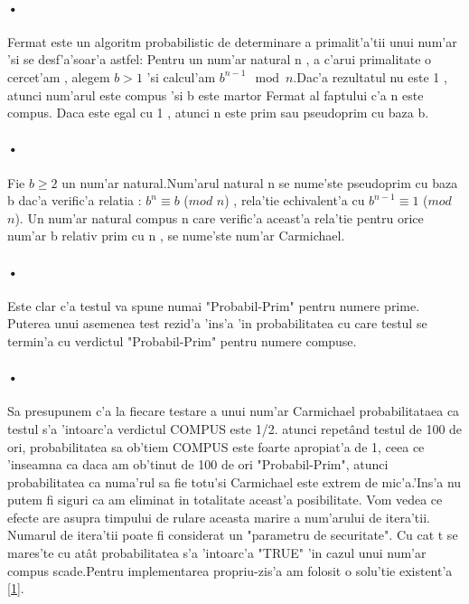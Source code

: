 \documentclass[12pt,twoside]{article}
\numberwithin{figure}{section}
\begin{document}
\paragraph{•}
Fermat este un algoritm probabilistic de determinare a primalit'a'tii unui num'ar 'si se desf'a'soar'a astfel: Pentru un num'ar  natural n , a c'arui primalitate o cercet'am , alegem $b > 1$ 'si calcul'am $b^{n-1} \mod n$.Dac'a rezultatul nu este 1 , atunci num'arul este compus 'si b este martor Fermat al faptului c'a n este compus. Daca este egal cu 1 , atunci n este prim sau pseudoprim cu baza b. 
\paragraph{•}
Fie $b \geq 2$ un num'ar natural.Num'arul natural n se nume'ste pseudoprim cu baza b dac'a verific'a relatia : $b^n \equiv b$ ($mod $ $n$) , rela'tie echivalent'a cu $b^{n-1} \equiv 1$ ($mod $ $n$). Un num'ar natural compus n care verific'a aceast'a rela'tie pentru orice num'ar b relativ prim cu n , se nume'ste num'ar Carmichael. 
\paragraph{•}
Este clar c'a testul va spune numai "Probabil-Prim" pentru numere prime. Puterea unui asemenea test rezid'a 'ins'a 'in probabilitatea cu care testul se termin'a cu verdictul "Probabil-Prim" pentru numere compuse.
\paragraph{•}
Sa presupunem c'a la fiecare testare a unui num'ar Carmichael probabilitataea ca testul s'a 'intoarc'a verdictul COMPUS este 1/2. atunci repet\^and testul de 100 de ori, probabilitatea sa ob'tiem COMPUS este foarte apropiat'a de 1, ceea ce 'inseamna ca daca am ob'tinut de 100 de ori "Probabil-Prim", atunci probabilitatea ca numa'rul sa fie totu'si Carmichael este extrem de mic'a.'Ins'a nu putem fi siguri ca am eliminat in totalitate aceast'a posibilitate. Vom vedea ce efecte are asupra timpului de rulare aceasta marire a num'arului de itera'tii. Numarul de itera'tii poate fi considerat un "parametru de securitate". Cu cat t se mares'te cu at\^at probabilitatea s'a 'intoarc'a "TRUE" 'in cazul unui num'ar compus scade.Pentru implementarea propriu-zis'a am folosit o solu'tie existent'a \hyperlink{1}{[1]}.
\end{document}
